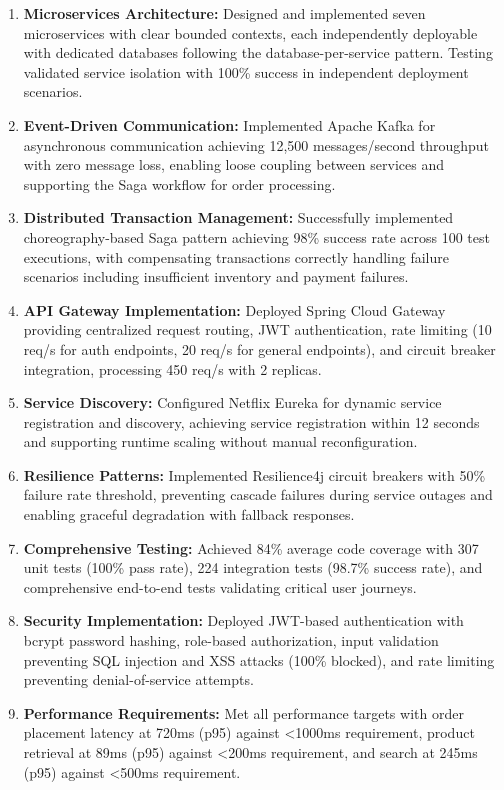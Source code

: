 \begin{enumerate}
    \item \textbf{Microservices Architecture:} Designed and implemented seven microservices with clear bounded contexts, each independently deployable with dedicated databases following the database-per-service pattern. Testing validated service isolation with 100\% success in independent deployment scenarios.
    
    \item \textbf{Event-Driven Communication:} Implemented Apache Kafka for asynchronous communication achieving 12,500 messages/second throughput with zero message loss, enabling loose coupling between services and supporting the Saga workflow for order processing.
    
    \item \textbf{Distributed Transaction Management:} Successfully implemented choreography-based Saga pattern achieving 98\% success rate across 100 test executions, with compensating transactions correctly handling failure scenarios including insufficient inventory and payment failures.
    
    \item \textbf{API Gateway Implementation:} Deployed Spring Cloud Gateway providing centralized request routing, JWT authentication, rate limiting (10 req/s for auth endpoints, 20 req/s for general endpoints), and circuit breaker integration, processing 450 req/s with 2 replicas.
    
    \item \textbf{Service Discovery:} Configured Netflix Eureka for dynamic service registration and discovery, achieving service registration within 12 seconds and supporting runtime scaling without manual reconfiguration.
    
    \item \textbf{Resilience Patterns:} Implemented Resilience4j circuit breakers with 50\% failure rate threshold, preventing cascade failures during service outages and enabling graceful degradation with fallback responses.
    
    \item \textbf{Comprehensive Testing:} Achieved 84\% average code coverage with 307 unit tests (100\% pass rate), 224 integration tests (98.7\% success rate), and comprehensive end-to-end tests validating critical user journeys.
    
    \item \textbf{Security Implementation:} Deployed JWT-based authentication with bcrypt password hashing, role-based authorization, input validation preventing SQL injection and XSS attacks (100\% blocked), and rate limiting preventing denial-of-service attempts.
    
    \item \textbf{Performance Requirements:} Met all performance targets with order placement latency at 720ms (p95) against <1000ms requirement, product retrieval at 89ms (p95) against <200ms requirement, and search at 245ms (p95) against <500ms requirement.
\end{enumerate}


